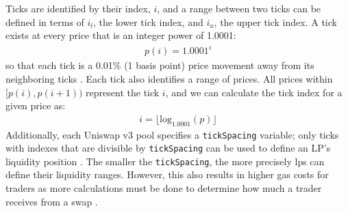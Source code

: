 \documentclass[11pt]{article}
\begin{document}
Ticks are identified by their index, $i$, and a range between two ticks can be defined in terms of $i_l$, the lower tick index, and $i_u$, the upper tick index. A tick exists at every price that is an integer power of 1.0001:
\begin{gather*}
    p(i) = 1.0001^i
\end{gather*}
so that each tick is a 0.01\% (1 basis point) price movement away from its neighboring ticks \citep{Uniswapv3}. Each tick also identifies a range of prices. All prices within $[p(i), p(i+1))$ represent the tick $i$, and we can calculate the tick index for a given price as:
\begin{gather*}
    i = \lfloor \text{log}_{1.0001}(p) \rfloor
\end{gather*}
Additionally, each Uniswap v3 pool specifies a \texttt{tickSpacing} variable; only ticks with indexes that are divisible by \texttt{tickSpacing} can be used to define an LP's liquidity position \citep{Uniswapv3}. The smaller the \texttt{tickSpacing}, the more precisely \glspl{lp} can define their liquidity ranges. However, this also results in higher gas costs for traders as more calculations must be done to determine how much a trader receives from a swap \citep{Uniswapv3}.
\end{document}
